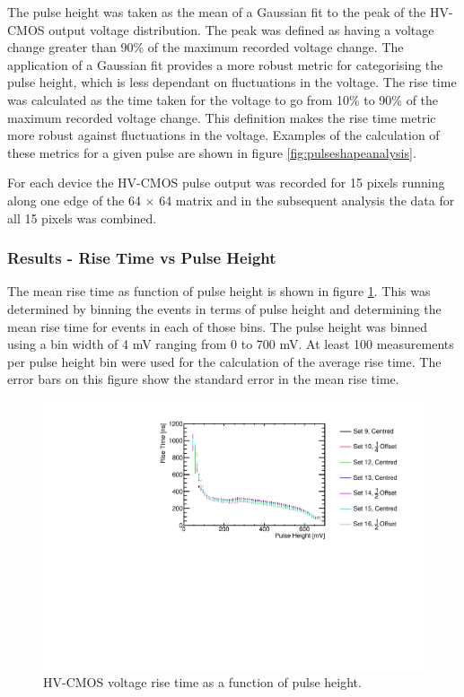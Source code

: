 The pulse height was taken as the mean of a Gaussian fit to the peak of the HV-CMOS output voltage distribution.  The peak was defined as having a voltage change greater than 90\% of the maximum recorded voltage change.  The application of a Gaussian fit provides a more robust metric for categorising the pulse height, which is less dependant on fluctuations in the voltage.  The rise time was calculated as the time taken for the voltage to go from 10\% to 90\% of the maximum recorded voltage change.  This definition makes the rise time metric more robust against fluctuations in the voltage.  Examples of the calculation of these metrics for a given pulse are shown in figure \ref{fig:pulseshapeanalysis}.

For each device the HV-CMOS pulse output was recorded for 15 pixels running along one edge of the 64 $\times$ 64 matrix and in the subsequent analysis the data for all 15 pixels was combined.


\subsubsection{Results -  Rise Time vs Pulse Height}
\label{sec:resultsrisetimepulseheight}
The mean rise time as function of pulse height is shown in figure \ref{fig:risetime}.  This was determined by binning the events in terms of pulse height and determining the mean rise time for events in each of those bins.  The pulse height was binned using a bin width of 4 mV ranging from 0 to 700 mV.  At least 100 measurements per pulse height bin were used for the calculation of the average rise time.  The error bars on this figure show the standard error in the mean rise time.  

\begin{figure}
\centering
\includegraphics[width=1.0\textwidth]{CLICdpVertex/Plots/RadSourceAnalysis/AllSETs_RiseTime_PulseHeight.pdf}
\caption[HV-CMOS voltage rise time as a function of pulse height.]{HV-CMOS voltage rise time as a function of pulse height.}
\label{fig:risetime}
\end{figure}


